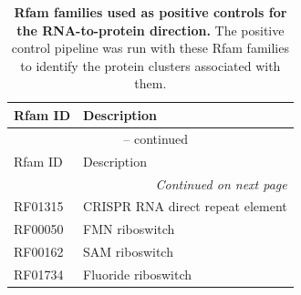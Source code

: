 \begingroup
\footnotesize
\begin{longtable}{p{}p{}}
\caption[Positive controls (RNA $\rightarrow$ protein)]{\textbf{Rfam families used as positive controls for the RNA-to-protein direction.}
    The positive control pipeline was run with these Rfam families to identify the protein clusters associated with them.}
\label{tab:positive_controls_input} \\
\hline
Rfam ID & Description \\
\hline
\endfirsthead
\multicolumn{2}{c}{\tablename\ \thetable{} -- continued} \\
\hline
Rfam ID & Description \\
\hline
\endhead
\hline
\multicolumn{2}{r}{\emph{Continued on next page}} \\
\endfoot
\hline
\endlastfoot
RF01315 & CRISPR RNA direct repeat element \\
RF00050 & FMN riboswitch \\
RF00162 & SAM riboswitch \\
RF01734 & Fluoride riboswitch \\
\end{longtable}
\endgroup